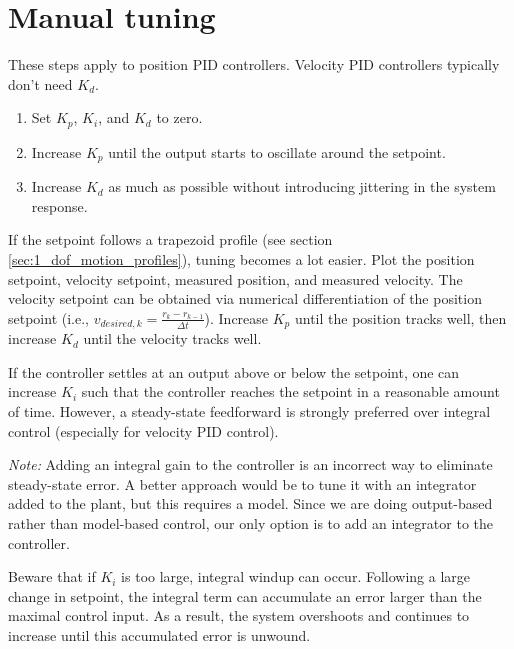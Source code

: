 \section{Manual tuning}

These steps apply to position PID controllers. Velocity PID controllers
typically don't need $K_d$.
\begin{enumerate}
  \item Set $K_p$, $K_i$, and $K_d$ to zero.
  \item Increase $K_p$ until the \gls{output} starts to oscillate around the
    \gls{setpoint}.
  \item Increase $K_d$ as much as possible without introducing jittering in the
    \gls{system response}.
\end{enumerate}

If the \gls{setpoint} follows a trapezoid profile (see section
\ref{sec:1_dof_motion_profiles}), tuning becomes a lot easier. Plot the position
\gls{setpoint}, velocity \gls{setpoint}, measured position, and measured
velocity. The velocity \gls{setpoint} can be obtained via numerical
differentiation of the position \gls{setpoint} (i.e.,
$v_{desired,k} = \frac{r_k - r_{k-1}}{\Delta t}$). Increase $K_p$ until the
position tracks well, then increase $K_d$ until the velocity tracks well.

If the \gls{controller} settles at an \gls{output} above or below the
\gls{setpoint}, one can increase $K_i$ such that the \gls{controller} reaches
the \gls{setpoint} in a reasonable amount of time. However, a steady-state
feedforward is strongly preferred over integral control (especially for velocity
PID control).
\begin{remark}
  \textit{Note:} Adding an integral gain to the \gls{controller} is an incorrect
  way to eliminate \gls{steady-state error}. A better approach would be to tune
  it with an integrator added to the \gls{plant}, but this requires a
  \gls{model}. Since we are doing output-based rather than model-based control,
  our only option is to add an integrator to the \gls{controller}.
\end{remark}

Beware that if $K_i$ is too large, integral windup can occur. Following a large
change in \gls{setpoint}, the integral term can accumulate an error larger than
the maximal \gls{control input}. As a result, the system overshoots and
continues to increase until this accumulated error is unwound.
